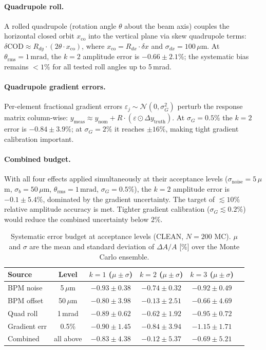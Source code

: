 \documentclass[preprint,12pt]{elsarticle}
\begin{document}
\paragraph{Quadrupole roll.}
A rolled quadrupole (rotation angle $\theta$ about the beam axis) couples the
horizontal closed orbit $x_\mathrm{co}$ into the vertical plane via skew
quadrupole terms: $\delta\mathrm{COD}\approx R_{dy}\cdot(2\theta\cdot x_\mathrm{co})$,
where $x_\mathrm{co}=R_{dx}\cdot\delta x$ and $\sigma_{dx}=100\,\mu$m.
At $\theta_\mathrm{rms}=1\,\mathrm{mrad}$, the $k=2$ amplitude error is
$-0.66\pm2.1\%$; the systematic bias remains $<1\%$ for all tested roll angles
up to 5\,mrad.

\paragraph{Quadrupole gradient errors.}
Per-element fractional gradient errors $\varepsilon_j\sim\mathcal{N}(0,\sigma_G^2)$
perturb the response matrix column-wise:
$y_\mathrm{meas}\approx y_\mathrm{nom}+R\cdot(\varepsilon\odot\Delta y_\mathrm{truth})$.
At $\sigma_G=0.5\%$ the $k=2$ error is $-0.84\pm3.9\%$; at $\sigma_G=2\%$
it reaches $\pm16\%$, making tight gradient calibration important.

\paragraph{Combined budget.}
With all four effects applied simultaneously at their acceptance levels
($\sigma_\mathrm{noise}=5\,\mu$m, $\sigma_b=50\,\mu$m, $\theta_\mathrm{rms}=1\,\mathrm{mrad}$,
$\sigma_G=0.5\%$), the $k=2$ amplitude error is $-0.1\pm5.4\%$, dominated
by the gradient uncertainty.  The target of $\lesssim10\%$ relative amplitude
accuracy is met.  Tighter gradient calibration ($\sigma_G\lesssim0.2\%$) would
reduce the combined uncertainty below $2\%$.

\begin{table}[h]
\centering
\caption{Systematic error budget at acceptance levels (CLEAN, $N=200$ MC).
$\mu$ and $\sigma$ are the mean and standard deviation of $\Delta A/A$ [\%]
over the Monte Carlo ensemble.}
\label{tab:systematics}
\begin{tabular}{lccccc}
\toprule
Source & Level & $k=1$ ($\mu\pm\sigma$) & $k=2$ ($\mu\pm\sigma$) & $k=3$ ($\mu\pm\sigma$) \\
\midrule
BPM noise    & 5\,$\mu$m  & $-0.93\pm0.38$ & $-0.74\pm0.32$ & $-0.92\pm0.49$ \\
BPM offset   & 50\,$\mu$m & $-0.80\pm3.98$ & $-0.13\pm2.51$ & $-0.66\pm4.69$ \\
Quad roll    & 1\,mrad    & $-0.89\pm0.62$ & $-0.62\pm1.92$ & $-0.95\pm0.72$ \\
Gradient err & 0.5\%      & $-0.90\pm1.45$ & $-0.84\pm3.94$ & $-1.15\pm1.71$ \\
\midrule
Combined     & all above  & $-0.83\pm4.38$ & $-0.12\pm5.37$ & $-0.69\pm5.21$ \\
\bottomrule
\end{tabular}
\end{table}
\end{document}
